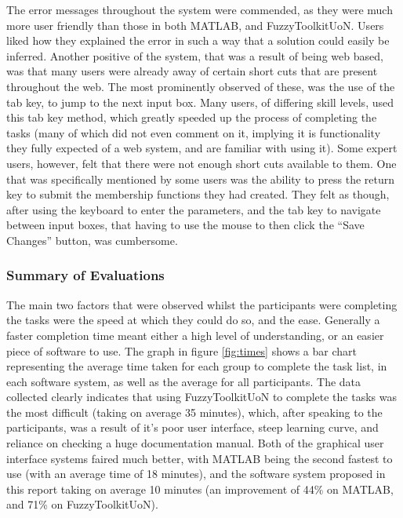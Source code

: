 The error messages throughout the system were commended, as they were much more user friendly than those in both MATLAB, and FuzzyToolkitUoN. Users liked how they explained the error in such a way that a solution could easily be inferred. Another positive of the system, that was a result of being web based, was that many users were already away of certain short cuts that are present throughout the web. The most prominently observed of these, was the use of the tab key, to jump to the next input box. Many users, of differing skill levels, used this tab key method, which greatly speeded up the process of completing the tasks (many of which did not even comment on it, implying it is functionality they fully expected of a web system, and are familiar with using it). Some expert users, however, felt that there were not enough short cuts available to them. One that was specifically mentioned by some users was the ability to press the return key to submit the membership functions they had created. They felt as though, after using the keyboard to enter the parameters, and the tab key to navigate between input boxes, that having to use the mouse to then click the ``Save Changes'' button, was cumbersome.

\subsubsection{Summary of Evaluations}
\vspace{-2mm}	
The main two factors that were observed whilst the participants were completing the tasks were the speed at which they could do so, and the ease. Generally a faster completion time meant either a high level of understanding, or an easier piece of software to use. The graph in figure \ref{fig:times} shows a bar chart representing the average time taken for each group to complete the task list, in each software system, as well as the average for all participants. The data collected clearly indicates that using FuzzyToolkitUoN to complete the tasks was the most difficult (taking on average  35 minutes), which, after speaking to the participants, was a result of it's poor user interface, steep learning curve, and reliance on checking a huge documentation manual. Both of the graphical user interface systems faired much better, with MATLAB being the second fastest to use (with an average time of 18 minutes), and the software system proposed in this report taking on average 10 minutes (an improvement of 44\% on MATLAB, and 71\% on FuzzyToolkitUoN). 
			
